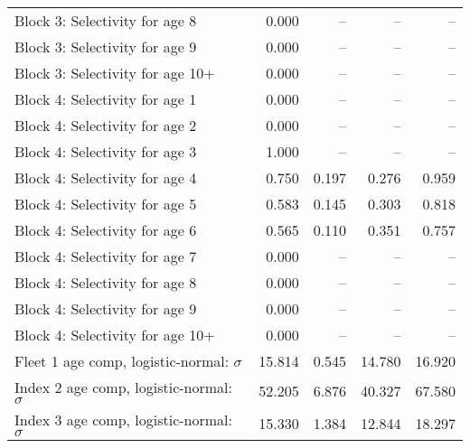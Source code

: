 \documentclass[
]{article}
\begin{document}
\begin{landscape}
\begin{longtable}[t]{lrrrr}
Block 3: Selectivity for age 8 & 0.000 & -- & -- & --\\
Block 3: Selectivity for age 9 & 0.000 & -- & -- & --\\
Block 3: Selectivity for age 10+ & 0.000 & -- & -- & --\\
Block 4: Selectivity for age 1 & 0.000 & -- & -- & --\\
\addlinespace
Block 4: Selectivity for age 2 & 0.000 & -- & -- & --\\
Block 4: Selectivity for age 3 & 1.000 & -- & -- & --\\
Block 4: Selectivity for age 4 & 0.750 & 0.197 & 0.276 & 0.959\\
Block 4: Selectivity for age 5 & 0.583 & 0.145 & 0.303 & 0.818\\
Block 4: Selectivity for age 6 & 0.565 & 0.110 & 0.351 & 0.757\\
\addlinespace
Block 4: Selectivity for age 7 & 0.000 & -- & -- & --\\
Block 4: Selectivity for age 8 & 0.000 & -- & -- & --\\
Block 4: Selectivity for age 9 & 0.000 & -- & -- & --\\
Block 4: Selectivity for age 10+ & 0.000 & -- & -- & --\\
Fleet 1 age comp, logistic-normal: $\sigma$ & 15.814 & 0.545 & 14.780 & 16.920\\
\addlinespace
Index 2 age comp, logistic-normal: $\sigma$ & 52.205 & 6.876 & 40.327 & 67.580\\
Index 3 age comp, logistic-normal: $\sigma$ & 15.330 & 1.384 & 12.844 & 18.297\\*
\end{longtable}
\end{landscape}
\end{document}
